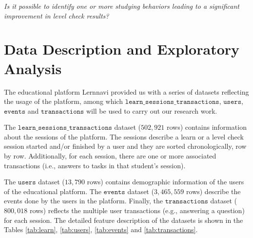 \documentclass[sigplan,screen]{acmart}
\begin{document}
\begin{displayquote}
\textit{Is it possible to identify one or more studying behaviors leading to a significant improvement in level check results?}
\end{displayquote}



\section{Data Description and Exploratory Analysis}\label{sec:data}


The educational platform Lernnavi provided us with a series of datasets reflecting the usage of the platform, among which $\texttt{learn\_sessions\_transactions}$, $\texttt{users}$, $\texttt{events}$ and $\texttt{transactions}$ will be used to carry out our research work.

The $\texttt{learn\_sessions\_transactions}$ dataset ($502,921$ rows) contains information about the sessions of the platform. The sessions describe a learn or a level check session started and/or finished by a user and they are sorted chronologically, row by row. Additionally, for each session, there are one or more associated transactions (i.e., answers to tasks in that student's session).

The $\texttt{users}$ dataset ($13,790$ rows) contains demographic information of the users of the educational platform. The $\texttt{events}$ dataset ($3,465,559$ rows) describe the events done by the users in the platform. Finally, the $\texttt{transactions}$ dataset ($800,018$ rows) reflects the multiple user transactions (e.g., answering a question) for each session. The detailed feature description of the datasets is shown in the Tables \ref{tab:learn}, \ref{tab:users}, \ref{tab:events} and \ref{tab:transactions}.
\end{document}
